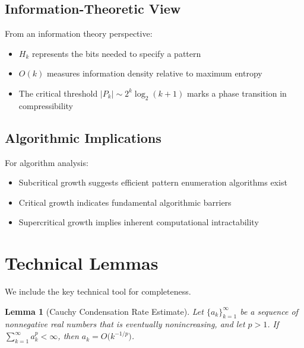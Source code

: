 \documentclass[11pt]{article}
\newtheorem{lemma}[theorem]{Lemma}
\theoremstyle{definition}
\begin{document}
\subsection{Information-Theoretic View}

From an information theory perspective:
\begin{itemize}
\item $H_k$ represents the bits needed to specify a pattern
\item $O(k)$ measures information density relative to maximum entropy
\item The critical threshold $|P_k|\sim 2^k\log_2(k+1)$ marks a phase transition in compressibility
\end{itemize}

\subsection{Algorithmic Implications}

For algorithm analysis:
\begin{itemize}
\item Subcritical growth suggests efficient pattern enumeration algorithms exist
\item Critical growth indicates fundamental algorithmic barriers
\item Supercritical growth implies inherent computational intractability
\end{itemize}

\section{Technical Lemmas}

We include the key technical tool for completeness.

\begin{lemma}[Cauchy Condensation Rate Estimate]\label{lem:dyadic}
Let $\{a_k\}_{k=1}^\infty$ be a sequence of nonnegative real numbers that is eventually nonincreasing, and let $p>1$. If $\sum_{k=1}^\infty a_k^{p}<\infty$, then $a_k=O\big(k^{-1/p}\big)$.
\end{lemma}
\end{document}
